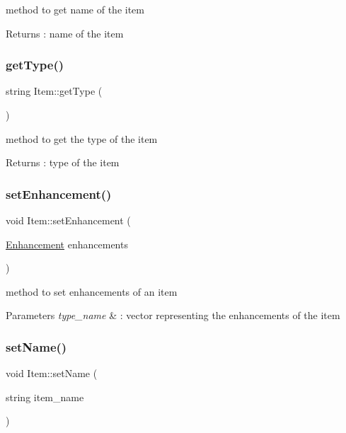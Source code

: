 method to get name of the item \begin{DoxyReturn}{Returns}
\+: name of the item 
\end{DoxyReturn}
\hypertarget{class_item_a2aea1cc560205b01eaf5250c21f4fc71}{}\label{class_item_a2aea1cc560205b01eaf5250c21f4fc71} 
\subsubsection{\texorpdfstring{get\+Type()}{getType()}}
{\footnotesize\ttfamily string Item\+::get\+Type (\begin{DoxyParamCaption}{ }\end{DoxyParamCaption})}

method to get the type of the item \begin{DoxyReturn}{Returns}
\+: type of the item 
\end{DoxyReturn}
\hypertarget{class_item_a7f9dd7e7d5272a4c3bfa72798087ef37}{}\label{class_item_a7f9dd7e7d5272a4c3bfa72798087ef37} 
\subsubsection{\texorpdfstring{set\+Enhancement()}{setEnhancement()}}
{\footnotesize\ttfamily void Item\+::set\+Enhancement (\begin{DoxyParamCaption}\item[{\hyperlink{class_enhancement}{Enhancement}}]{enhancements }\end{DoxyParamCaption})}

method to set enhancements of an item 
\begin{DoxyParams}{Parameters}
{\em type\+\_\+name} & \+: vector representing the enhancements of the item \\
\hline
\end{DoxyParams}
\hypertarget{class_item_a5dcdff1db4c66ca22bd6a3f826c69644}{}\label{class_item_a5dcdff1db4c66ca22bd6a3f826c69644} 
\subsubsection{\texorpdfstring{set\+Name()}{setName()}}
{\footnotesize\ttfamily void Item\+::set\+Name (\begin{DoxyParamCaption}\item[{string}]{item\+\_\+name }\end{DoxyParamCaption})}


